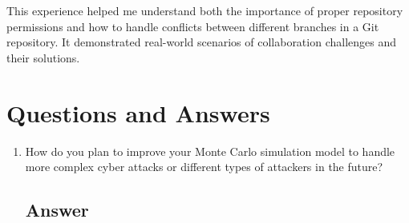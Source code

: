 This experience helped me understand both the importance of proper repository permissions and 
how to handle conflicts between different branches in a Git repository. It demonstrated 
real-world scenarios of collaboration challenges and their solutions.

\section{Questions and Answers}
\begin{enumerate}
    \item How do you plan to improve your Monte Carlo simulation model to handle more complex cyber attacks or different types of attackers in the future?
    
    \subsection*{Answer}

\end{enumerate}


% 

